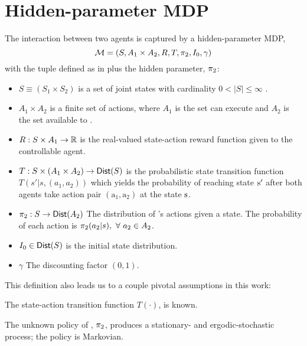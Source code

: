 \section{Hidden-parameter MDP}\label{sec:hipmdp}
    \begin{definition}\label{def:hipmdp}
        The interaction between two agents is captured by a hidden-parameter \ac{MDP},
        \[
            \mathcal{M} = (S, A_1 \times A_2, R, T, \pi_{2}, I_0 , \gamma)
        \]
        with the tuple defined as in \cite{Sugiyama2015StatisticalRL} plus the hidden parameter, $\pi_{2}$:
        \begin{itemize}
                \item $S \equiv (S_1 \times S_2)$ is a set of joint states with cardinality $0 < |S| \leq \infty$ .
            \item $A_1\times A_2$ is a finite set of actions, where $A_1$ is the set  can execute and $A_2$ is
                the set available to .
            \item $R: S\times A_1 \rightarrow \mathbb{R}$ is the real-valued state-action reward function given to the
                controllable agent.
            \item $T: S\times (A_1\times A_2)\rightarrow \mathsf{Dist}(S)$ is the probabilistic state transition function
                $ T(s'| s, (a_1,a_2)) $ which yields the probability of reaching state $\textnormal{s}'$ after both
                agents take action pair $(\text{a}_1,\text{a}_2)$ at the state $\textnormal{s}$.
            \item $\pi_{2} : S \rightarrow \mathsf{Dist}(A_2)$ The distribution of \!'s actions given a
                state. The probability of each action is $\pi_{2}(a_2|s),\ \forall\ a_2 \in A_2$.
            \item $I_0 \in \mathsf{Dist}(S)$ is the initial state distribution.
            \item $\gamma$ The discounting factor $(0,1)$.
        \end{itemize}
    \end{definition}

    \noindent
    This definition also leads us to a couple pivotal assumptions in this work:

    \begin{assumption}
        The state-action transition function $T(\cdot)$, is known.
    \end{assumption}

    \begin{assumption}
        The unknown policy of , $\pi_{2}$, produces a stationary- and ergodic-stochastic process; the policy
        is Markovian.
    \end{assumption}

